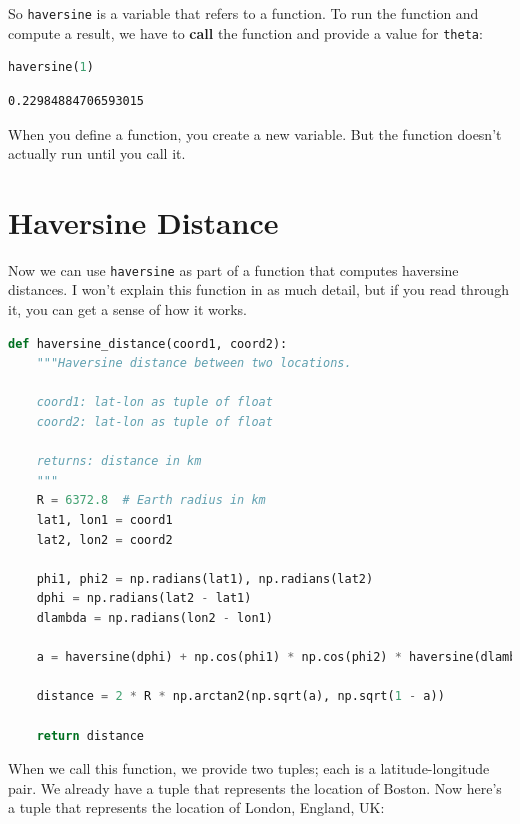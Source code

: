 So \passthrough{\lstinline!haversine!} is a variable that refers to a
function. To run the function and compute a result, we have to
\textbf{call} the function and provide a value for
\passthrough{\lstinline!theta!}:

\begin{lstlisting}[language=Python,style=source]
haversine(1)
\end{lstlisting}

\begin{lstlisting}[style=output]
0.22984884706593015
\end{lstlisting}

When you define a function, you create a new variable. But the function
doesn't actually run until you call it.

\hypertarget{haversine-distance}{%
\section{Haversine Distance}\label{haversine-distance}}

Now we can use \passthrough{\lstinline!haversine!} as part of a function
that computes haversine distances. I won't explain this function in as
much detail, but if you read through it, you can get a sense of how it
works.

\begin{lstlisting}[language=Python,style=source]
def haversine_distance(coord1, coord2):
    """Haversine distance between two locations.
    
    coord1: lat-lon as tuple of float 
    coord2: lat-lon as tuple of float
    
    returns: distance in km
    """
    R = 6372.8  # Earth radius in km
    lat1, lon1 = coord1
    lat2, lon2 = coord2
    
    phi1, phi2 = np.radians(lat1), np.radians(lat2) 
    dphi = np.radians(lat2 - lat1)
    dlambda = np.radians(lon2 - lon1)
    
    a = haversine(dphi) + np.cos(phi1) * np.cos(phi2) * haversine(dlambda)
    
    distance = 2 * R * np.arctan2(np.sqrt(a), np.sqrt(1 - a))
    
    return distance
\end{lstlisting}

When we call this function, we provide two tuples; each is a
latitude-longitude pair. We already have a tuple that represents the
location of Boston. Now here's a tuple that represents the location of
London, England, UK:

